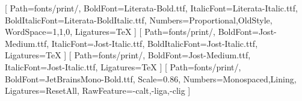 
\pagecolor{white}
\AtBeginDocument{\color{bktext}}

\usepackage{fontspec}
\usepackage{iftex}

\setmainfont{Literata-Regular.ttf}[
  Path=fonts/print/,
  BoldFont=Literata-Bold.ttf,
  ItalicFont=Literata-Italic.ttf,
  BoldItalicFont=Literata-BoldItalic.ttf,
  Numbers={Proportional,OldStyle},
  WordSpace={1,1,0},
  Ligatures=TeX ]
\newfontfamily{}[
  Path=fonts/print/,
  BoldFont=Jost-Medium.ttf,
  ItalicFont=Jost-Italic.ttf,
  BoldItalicFont=Jost-Italic.ttf,
  Ligatures=TeX ]
\setsansfont{Jost-Regular.ttf}[
  Path=fonts/print/,
  BoldFont=Jost-Medium.ttf,
  ItalicFont=Jost-Italic.ttf,
  Ligatures=TeX ]
\setmonofont{JetBrainsMono-Regular.ttf}[
  Path=fonts/print/,
  BoldFont=JetBrainsMono-Bold.ttf,
  Scale=0.86,
  Numbers={Monospaced,Lining},
  Ligatures=ResetAll,
  RawFeature={-calt,-liga,-clig} ]

\newcommand{\bkls}[1]{{\addfontfeature{LetterSpace=14}#1}}
\AtBeginDocument{\raggedbottom}
\newcommand{\bklabelfont}{\sffamily\bfseries\fontsize{7.5pt}{9pt}\selectfont}
\newcommand{\eyebrow}[2][bkink]{{\bklabelfont\color{#1}\bkls{#2}}}

\AtBeginDocument{\hypersetup{
  colorlinks=true,
  linkcolor=bkink, citecolor=bkink,
  urlcolor=bkink, filecolor=bkink }}

